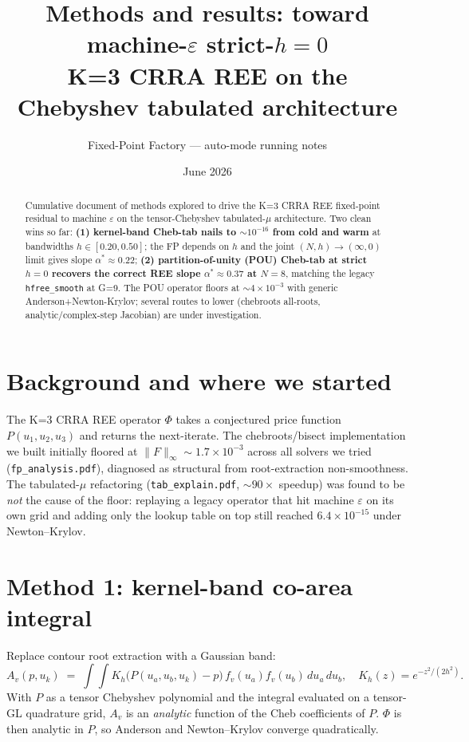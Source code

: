 \documentclass[11pt]{article}
\title{Methods and results: toward machine-$\varepsilon$ strict-$h{=}0$\\
       K=3 CRRA REE on the Chebyshev tabulated architecture}
\author{Fixed-Point Factory --- auto-mode running notes}
\date{June 2026}
\begin{document}
\maketitle

\begin{abstract}
\noindent
Cumulative document of methods explored to drive the K=3 CRRA REE
fixed-point residual to machine $\varepsilon$ on the tensor-Chebyshev
tabulated-$\mu$ architecture. Two clean wins so far:
\textbf{(1) kernel-band Cheb-tab nails to $\sim\!10^{-16}$ from cold and
warm} at bandwidths $h \in [0.20, 0.50]$; the FP depends on $h$ and the
joint $(N, h) \to (\infty, 0)$ limit gives slope $\alpha^* \approx 0.22$;
\textbf{(2) partition-of-unity (POU) Cheb-tab at strict $h{=}0$
recovers the correct REE slope $\alpha^* \approx 0.37$ at $N{=}8$},
matching the legacy \texttt{hfree\_smooth} at G=9. The POU operator
floors at $\sim 4\!\times\!10^{-3}$ with generic Anderson+Newton-Krylov;
several routes to lower (chebroots all-roots, analytic/complex-step
Jacobian) are under investigation.
\end{abstract}

\tableofcontents

\section{Background and where we started}

The K=3 CRRA REE operator $\Phi$ takes a conjectured price function
$P(u_1,u_2,u_3)$ and returns the next-iterate. The chebroots/bisect
implementation we built initially floored at $\|F\|_\infty \sim 1.7\!
\times\!10^{-3}$ across all solvers we tried (\texttt{fp\_analysis.pdf}),
diagnosed as structural from root-extraction non-smoothness. The
tabulated-$\mu$ refactoring (\texttt{tab\_explain.pdf}, $\sim 90\times$
speedup) was found to be \emph{not} the cause of the floor: replaying a
legacy operator that hit machine $\varepsilon$ on its own grid and
adding only the lookup table on top still reached $6.4\!\times\!10^{-15}$
under Newton--Krylov.

\section{Method 1: kernel-band co-area integral}

Replace contour root extraction with a Gaussian band:
\[
   A_v(p, u_k) \;=\; \int\!\!\int K_h\!\big(P(u_a, u_b, u_k) - p\big)\,
                       f_v(u_a) f_v(u_b)\, du_a\, du_b,
   \quad K_h(z) = e^{-z^2/(2h^2)}.
\]
With $P$ as a tensor Chebyshev polynomial and the integral evaluated
on a tensor-GL quadrature grid, $A_v$ is an \emph{analytic} function of
the Cheb coefficients of $P$. $\Phi$ is then analytic in $P$, so
Anderson and Newton--Krylov converge quadratically.
\end{document}
